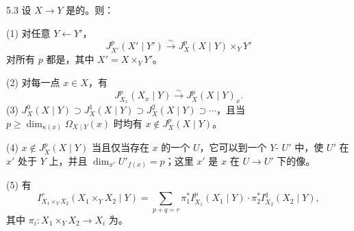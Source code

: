 \begin{SGAresult}{}{5.3}
设 $X\to Y$ 是的。则：

(1) 对任意 $Y\leftarrow Y'$，
\[
J_{X'}^p(X'\mid Y')\xrightarrow\sim J_X^p(X\mid Y)\times_Y Y'
\]
对所有 $p$ 都是，其中 $X'=X\times_Y Y'$。

(2) 对每一点 $x\in X$，有
\[
J_{X_x}^p(X_x\mid Y)\xrightarrow\sim J_X^p(X\mid Y)_x.
\]
(3) $J_X^0(X\mid Y)\supset J_X^1(X\mid Y)\supset J_X^2(X\mid Y)\supset\cdots$，且当 $p\geq\dim_{\kappa(x)}\Omega_{X\mid Y}(x)$ 时均有 $x\notin J_X^p(X\mid Y)$。

(4) $x\notin J_X^p(X\mid Y)$ 当且仅当存在 $x$ 的一个 $U$，它可以到一个 $Y$- $U'$ 中，使 $U'$ 在 $x'$ 处于 $Y$ 上，并且 $\dim_{x'}U'_{f(x)}=p$；这里 $x'$ 是 $x$ 在 $U\to U'$ 下的像。

(5) 有
\[
I_{X_1\times_Y X_2}^r(X_1\times_Y X_2\mid Y)
 =\sum_{p+q=r}\pi_1^*I_{X_1}^p(X_1\mid Y)\cdot\pi_2^*I_{X_2}^q(X_2\mid Y),
\]
其中 $\pi_i:X_1\times_Y X_2\to X_i$ 为。
\end{SGAresult}
